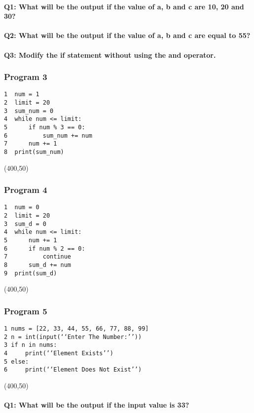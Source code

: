 \documentclass{article}
\begin{document}
\paragraph{Q1: What will be the output if the value of a, b and c are 10, 20 and 30?}
\paragraph{Q2: What will be the output if the value of a, b and c are equal to 55?}
\paragraph{Q3: Modify the if statement without using the and operator.}

\subsubsection{Program 3}
\begin{verbatim}
1  num = 1
2  limit = 20
3  sum_num = 0
4  while num <= limit:
5      if num % 3 == 0:
6          sum_num += num
7      num += 1
8  print(sum_num)
\end{verbatim}

\framebox(400,50){}

\subsubsection{Program 4}
\begin{verbatim}
1  num = 0
2  limit = 20
3  sum_d = 0
4  while num <= limit:
5      num += 1
6      if num % 2 == 0:
7          continue
8      sum_d += num
9  print(sum_d)
\end{verbatim}

\framebox(400,50){}

\subsubsection{Program 5}
\begin{verbatim}
1 nums = [22, 33, 44, 55, 66, 77, 88, 99]
2 n = int(input(‘‘Enter The Number:’’))
3 if n in nums:
4     print(‘‘Element Exists’’)
5 else:
6     print(‘‘Element Does Not Exist’’)
\end{verbatim}

\framebox(400,50){}

\paragraph{Q1: What will be the output if the input value is 33?}
\end{document}

